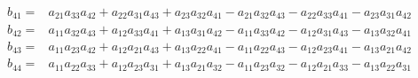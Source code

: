 \begin{align}
\begin{split}
		b_{41}=&a_{21}a_{33}a_{42}+a_{22}a_{31}a_{43}+a_{23}a_{32}a_{41}-a_{21}a_{32}a_{43}-a_{22}a_{33}a_{41}-a_{23}a_{31}a_{42} \\
		b_{42}=&a_{11}a_{32}a_{43}+a_{12}a_{33}a_{41}+a_{13}a_{31}a_{42}-a_{11}a_{33}a_{42}-a_{12}a_{31}a_{43}-a_{13}a_{32}a_{41} \\
		b_{43}=&a_{11}a_{23}a_{42}+a_{12}a_{21}a_{43}+a_{13}a_{22}a_{41}-a_{11}a_{22}a_{43}-a_{12}a_{23}a_{41}-a_{13}a_{21}a_{42} \\
		b_{44}=&a_{11}a_{22}a_{33}+a_{12}a_{23}a_{31}+a_{13}a_{21}a_{32}-a_{11}a_{23}a_{32}-a_{12}a_{21}a_{33}-a_{13}a_{22}a_{31} 
	\end{split}
\end{align}


